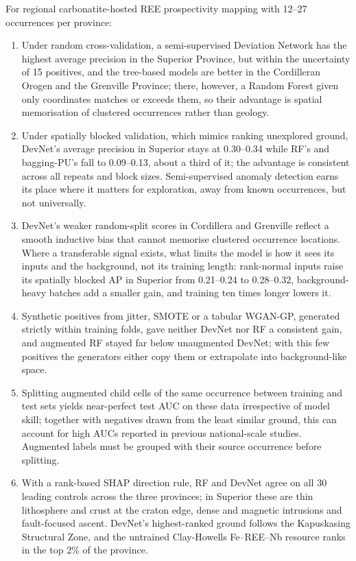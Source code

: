 \documentclass[pdflatex,sn-apa]{sn-jnl}
\begin{document}
For regional carbonatite-hosted REE prospectivity mapping with 12--27 occurrences per province:
\begin{enumerate}
\item Under random cross-validation, a semi-supervised Deviation Network has the highest average precision in the Superior Province, but within the uncertainty of 15 positives, and the tree-based models are better in the Cordilleran Orogen and the Grenville Province; there, however, a Random Forest given only coordinates matches or exceeds them, so their advantage is spatial memorisation of clustered occurrences rather than geology.
\item Under spatially blocked validation, which mimics ranking unexplored ground, DevNet's average precision in Superior stays at 0.30--0.34 while RF's and bagging-PU's fall to 0.09--0.13, about a third of it; the advantage is consistent across all repeats and block sizes. Semi-supervised anomaly detection earns its place where it matters for exploration, away from known occurrences, but not universally.
\item DevNet's weaker random-split scores in Cordillera and Grenville reflect a smooth inductive bias that cannot memorise clustered occurrence locations. Where a transferable signal exists, what limits the model is how it sees its inputs and the background, not its training length: rank-normal inputs raise its spatially blocked AP in Superior from 0.21--0.24 to 0.28--0.32, background-heavy batches add a smaller gain, and training ten times longer lowers it.
\item Synthetic positives from jitter, SMOTE or a tabular WGAN-GP, generated strictly within training folds, gave neither DevNet nor RF a consistent gain, and augmented RF stayed far below unaugmented DevNet; with this few positives the generators either copy them or extrapolate into background-like space.
\item Splitting augmented child cells of the same occurrence between training and test sets yields near-perfect test AUC on these data irrespective of model skill; together with negatives drawn from the least similar ground, this can account for high AUCs reported in previous national-scale studies. Augmented labels must be grouped with their source occurrence before splitting.
\item With a rank-based SHAP direction rule, RF and DevNet agree on all 30 leading controls across the three provinces; in Superior these are thin lithosphere and crust at the craton edge, dense and magnetic intrusions and fault-focused ascent. DevNet's highest-ranked ground follows the Kapuskasing Structural Zone, and the untrained Clay-Howells Fe--REE--Nb resource ranks in the top 2\% of the province.
\end{enumerate}
\end{document}

